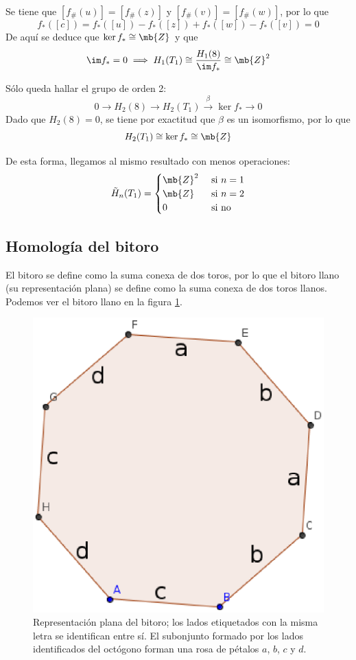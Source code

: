 Se tiene que $[f_\#(u)]=[f_\#(z)]$ y $[f_\#(v)]=[f_\#(w)]$, por lo que $$f_*([c])=f_*([u])-f_*([z])+f_*([w])-f_*([v])=0$$ De aquí se deduce que $\ker f_*\cong \mb{Z}$ y que \[\im f_*=0 \implies H_1(T_1)\cong \frac{H_1(8)}{\im f_*}\cong \mb{Z}^2\]

Sólo queda hallar el grupo de orden 2: \[0 \longrightarrow H_2(8) \longrightarrow H_2(T_1) \xrightarrow{\beta} \ker f_* \longrightarrow 0\] Dado que $H_2(8)=0$, se tiene por exactitud que $\beta$ es un isomorfismo, por lo que \[H_2(T_1) \cong \ker f_* \cong \mb{Z}\]

De esta forma, llegamos al mismo resultado con menos operaciones:
\[\tilde{H}_n(T_1)=
\begin{cases}
\mb{Z}^2	&\mbox{ si }n =1\\
\mb{Z}		&\mbox{ si }n =2\\
0     &\mbox{ si no}
\end{cases}\]

\subsection{Homología del bitoro}
El bitoro se define como la suma conexa de dos toros, por lo que el bitoro llano (su representación plana) se define como la suma conexa de dos toros llanos. Podemos ver el bitoro llano en la figura \ref{Bitoro}.
\\ 

\begin{figure}[h]
\centering
\includegraphics[scale=0.7]{Figures/Bitoro}
\caption{\label{Bitoro} Representación plana del bitoro; los lados etiquetados con la misma letra se identifican entre sí. El subonjunto formado por los lados identificados del octógono forman una rosa de pétalos $a$, $b$, $c$ y $d$.}
\end{figure}

